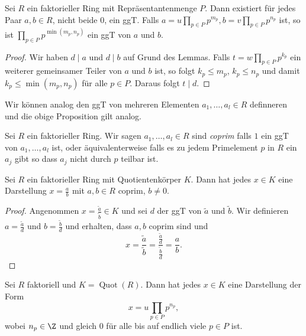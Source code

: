 \begin{proposition}[ggT]
	Sei $R$ ein faktorieller Ring mit Repräsentantenmenge $P$.
	Dann existiert für jedes Paar $a,b \in R$, nicht beide $0$,
	ein ggT. Falls $a = u \prod_{p \in P} p^{m_{p}}, b = v \prod_{p \in P} p^{n_{p}}$ ist, so ist
	$\prod_{p \in P} p^{\min(m_{p},n_{p})}$ ein ggT von $a$ und $b$.
\end{proposition}

\begin{proof}
	Wir haben $d \mid a$ und $d \mid b$ auf Grund des Lemmas.
	Falls $t = w \prod_{p \in P} p^{k_{p}}$ ein weiterer gemeinsamer Teiler von $a$ und $b$ ist,
	so folgt $k_{p} \leq m_{p}$, $k_{p} \leq n_{p}$ und damit $k_{p} \leq \min(m_{p}, n_{p})$ für alle $p \in P$.
	Daraus folgt $t \mid d$.
\end{proof}

Wir können analog den ggT von mehreren Elementen $a_1,\ldots, a_{l} \in R$ definneren und die obige Proposition gilt analog.

\begin{definition}
	Sei $R$ ein faktorieller Ring. Wir sagen $a_1,\ldots,a_{l} \in R$ sind \emph{coprim} falls $1$ ein ggT von
	$a_1,\ldots,a_{l}$ ist, oder äquivalenterweise falls es zu jedem Primelement $p$ in $R$ 
	ein $a_{j}$ gibt so dass $a_{j}$ nicht durch $p$ teilbar ist.
\end{definition}

\begin{corollar}
	Sei $R$ ein faktorieller Ring mit Quotientenkörper $K$.
	Dann hat jedes $x \in K$ eine Darstellung $x = \frac{a}{b}$ mit $a,b \in R$ coprim, $b \neq 0$.
\end{corollar}

\begin{proof}
	Angenommen $x = \frac{\widetilde{a}}{\widetilde{b}} \in K$ und sei $d$ der ggT von $\widetilde{a}$ und $\widetilde{b}$.
	Wir definieren $a = \frac{\widetilde{a}}{d}$ und $b = \frac{\widetilde{b}}{d}$ und erhalten, dass $a,b$ coprim
	sind und 
	\[
	x = \frac{\widetilde{a}}{\widetilde{b}} = \frac{\frac{\widetilde{a}}{d}}{\frac{\widetilde{b}}{d}} = \frac{a}{b}
	.\] 
\end{proof}

\begin{corollar}
	Sei $R$ faktoriell und $K = \operatorname{Quot}(R)$. Dann hat jedes $x \in K$ eine Darstellung der Form 
	\[
	x = u \prod_{p \in P} p^{n_{p}}
	,\]
	wobei $n_{p} \in \Z$ und gleich $0$ für alle bis auf endlich viele $p \in P$ ist.
\end{corollar}

